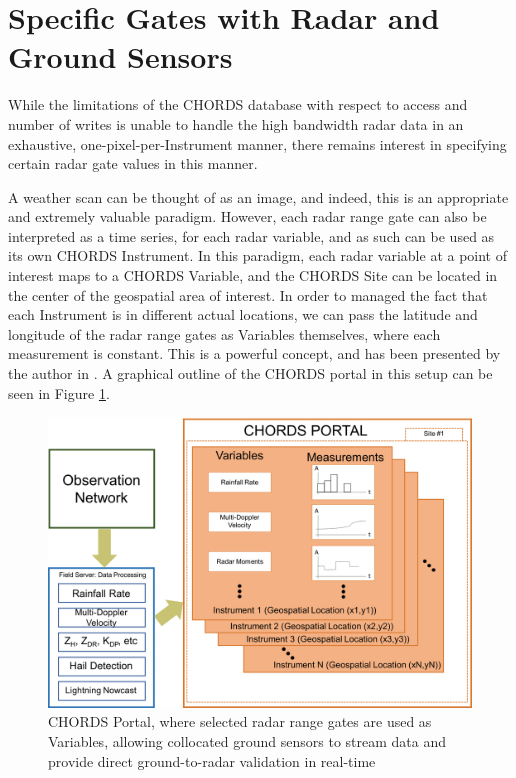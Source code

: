 \section{Specific Gates with Radar and Ground Sensors}
\label{sec:realtime_specificgates}

While the limitations of the CHORDS database with respect to access and number of writes is unable to handle the high bandwidth radar data in an exhaustive, one-pixel-per-Instrument manner, there remains interest in specifying certain radar gate values in this manner.

A weather scan can be thought of as an image, and indeed, this is an appropriate and extremely valuable paradigm. 
However, each radar range gate can also be interpreted as a time series, for each radar variable, and as such can be used as its own CHORDS Instrument.
In this paradigm, each radar variable at a point of interest maps to a CHORDS Variable, and the CHORDS Site can be located in the center of the geospatial area of interest.
In order to managed the fact that each Instrument is in different actual locations, we can pass the latitude and longitude of the radar range gates as Variables themselves, where each measurement is constant.
This is a powerful concept, and has been presented by the author in \cite{gooch2017integration}.
A graphical outline of the CHORDS portal in this setup can be seen in Figure \ref{fig:realtime_chordsportal_specificgates_concept}.

\begin{figure}[h]
	\centering
	\includegraphics[width=\textwidth]{./thesis_code/plots/chords_portal_concept.png}
	\caption{CHORDS Portal, where selected radar range gates are used as Variables, allowing collocated ground sensors to stream data and provide direct ground-to-radar validation in real-time}
	\label{fig:realtime_chordsportal_specificgates_concept}
\end{figure}

